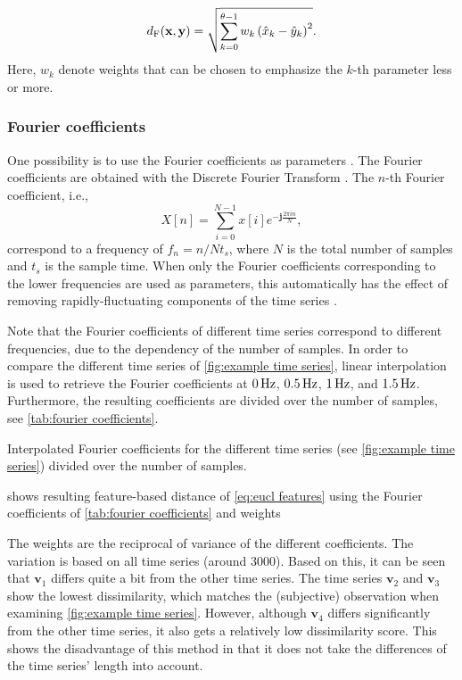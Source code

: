 \documentclass[10pt,final,a4paper,oneside,onecolumn]{article}
\newcommand{\imagi}{\textbf{j}}
\newcommand{\profile}[1]{\textbf{v}_{#1}}
\theoremstyle{plain}\newtheorem{definition}{Definition}[section]    %
\theoremstyle{definition}\newtheorem{example}{Example}[section]     %
\theoremstyle{remark}\newtheorem{remarkenv}{Remark}[section]        %
\begin{document}
\begin{equation}\label{eq:eucl features}
	d_{\textup{F}}(\textbf{x}, \textbf{y}) = \sqrt{ \sum_{k=0}^{\theta-1} w_k \left( \hat{x}_k - \hat{y}_k \right)^2 }.
\end{equation}
Here, $w_k$ denote weights that can be chosen to emphasize the $k$-th parameter less or more. 


\subsubsection{Fourier coefficients}
\label{sec:fourier coefficient}
One possibility is to use the Fourier coefficients as parameters \cite{agrawal1993similarity, faloutsos1994fast}. The Fourier coefficients are obtained with the Discrete Fourier Transform \cite{oppenheim1999discrete}. The $n$-th Fourier coefficient, i.e.,
\begin{equation}
	X[n] = \sum_{i=0}^{N-1} x[i] e^{-\imagi\frac{2\pi i n}{N}},
\end{equation}
correspond to a frequency of $f_n = n/Nt_s$, where $N$ is the total number of samples and $t_s$ is the sample time. When only the Fourier coefficients corresponding to the lower frequencies are used as parameters, this automatically has the effect of removing rapidly-fluctuating components of the time series \cite{serra2014empirical}.

Note that the Fourier coefficients of different time series correspond to different frequencies, due to the dependency of the number of samples. In order to compare the different time series of \cref{fig:example time series}, linear interpolation is used to retrieve the Fourier coefficients at $\unit[0]{Hz}$, $\unit[0.5]{Hz}$, $\unit[1]{Hz}$, and $\unit[1.5]{Hz}$. Furthermore, the resulting coefficients are divided over the number of samples, see \cref{tab:fourier coefficients}.

\begin{table}
	\centering
	\caption{Interpolated Fourier coefficients for the different time series (see \cref{fig:example time series}) divided over the number of samples.}
	\label{tab:fourier coefficients}
	
\end{table}

 shows resulting feature-based distance of \cref{eq:eucl features} using the Fourier coefficients of \cref{tab:fourier coefficients} and weights 
 
The weights are the reciprocal of variance of the different coefficients. The variation is based on all time series (around 3000). 
Based on this, it can be seen that $\profile{1}$ differs quite a bit from the other time series. The time series $\profile{2}$ and $\profile{3}$ show the lowest dissimilarity, which matches the (subjective) observation when examining \cref{fig:example time series}. However, although $\profile{4}$ differs significantly from the other time series, it also gets a relatively low dissimilarity score. This shows the disadvantage of this method in that it does not take the differences of the time series' length into account.
\end{document}
